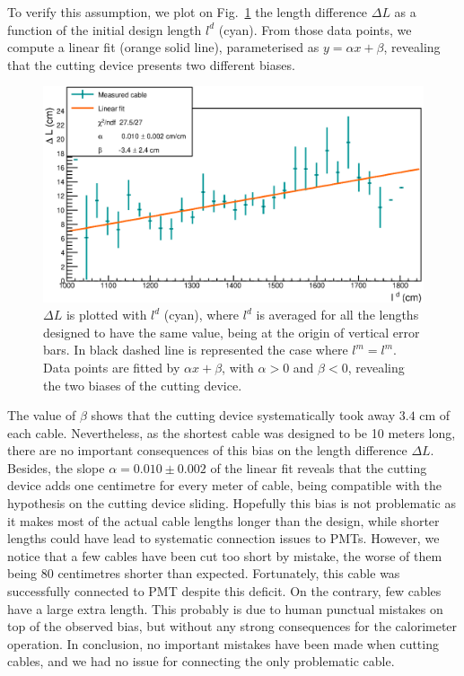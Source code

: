 To verify this assumption, we plot on Fig.~\ref{fig:CutBias} the length difference $\Delta L$ as a function of the initial design length $l^{d}$ (cyan).
From those data points, we compute a linear fit (orange solid line), parameterised as $y = \alpha x + \beta$, revealing that the cutting device presents two different biases.
\begin{figure}[h]
  \centering
  \includegraphics[width=15cm]{commissioning/fig_commissioning/cut_biais.eps}

  \caption{$\Delta L$ is plotted with $l^{d}$ (cyan), where $l^{d}$ is averaged for all the lengths designed to have the same value, being at the origin of vertical error bars.
    In black dashed line is represented the case where $l^{m} = l^{m}$.
    Data points are fitted by $\alpha x + \beta$, with $\alpha > 0$ and $\beta < 0$, revealing the two biases of the cutting device.
    \label{fig:CutBias}}
\end{figure}
The value of $\beta$ shows that the cutting device systematically took away $3.4$ cm of each cable.
Nevertheless, as the shortest cable was designed to be 10 meters long, there are no important consequences of this bias on the length difference $\Delta L$.
Besides, the slope $\alpha = 0.010\pm 0.002$ of the linear fit reveals that the cutting device adds one centimetre for every meter of cable, being compatible with the hypothesis on the cutting device sliding.
Hopefully this bias is not problematic as it makes most of the actual cable lengths longer than the design, while shorter lengths could have lead to systematic connection issues to PMTs.
However, we notice that a few cables have been cut too short by mistake, the worse of them being $80$ centimetres shorter than expected.
Fortunately, this cable  was successfully connected to PMT despite this deficit.
On the contrary, few cables have a large extra length.
This probably is due to human punctual mistakes on top of the observed bias, but without any strong consequences for the calorimeter operation.
In conclusion, no important mistakes have been made when cutting cables, and we had no issue for connecting the only problematic cable.

